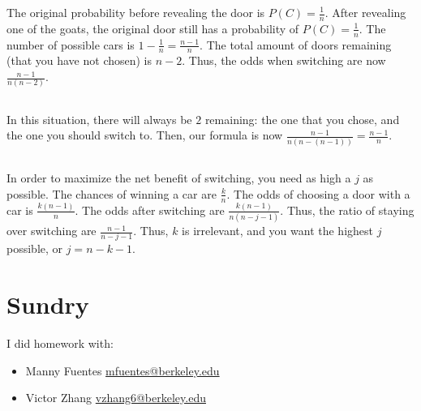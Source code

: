 \documentclass{article}
\begin{document}
The original probability before revealing the door is \(P(C) = \frac{1}{n}\).
After revealing one of the goats, the original door still has a probability of \(P(C) = \frac{1}{n}\).
The number of possible cars is \(1 - \frac{1}{n} = \frac{n - 1}{n}\).
The total amount of doors remaining (that you have not chosen) is \(n - 2\).
Thus, the odds when switching are now \(\frac{n - 1}{n (n - 2)}\).

\subsection{}

In this situation, there will always be \(2\) remaining: the one that you chose, and the one you should switch to.
Then, our formula is now \(\frac{n - 1}{n (n - (n - 1))} = \frac{n - 1}{n}\).

\subsection{}

In order to maximize the net benefit of switching, you need as high a \(j\) as possible.
The chances of winning a car are \(\frac{k}{n}\).
The odds of choosing a door with a car is \(\frac{k (n - 1)}{n}\).
The odds after switching are \(\frac{k (n - 1)}{n (n - j - 1)}\).
Thus, the ratio of staying over switching are \(\frac{n - 1}{n - j - 1}\).
Thus, \(k\) is irrelevant, and you want the highest \(j\) possible, or \(j = n - k - 1\).

\section{Sundry}

I did homework with:
\begin{itemize}
    \item Manny Fuentes \href{mailto:mfuentes@berkeley.edu}{mfuentes@berkeley.edu}
    \item Victor Zhang \href{mailto:vzhang6@berkeley.edu}{vzhang6@berkeley.edu}
\end{itemize}
\end{document}
